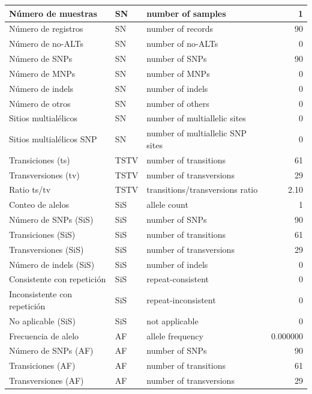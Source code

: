 \documentclass[12pt]{article}
\begin{document}
\begin{longtable}{|l|l|p{8cm}|r|}
    Número de muestras & SN & number of samples & 1 \\
    \hline
    Número de registros & SN & number of records & 90 \\
    \hline
    Número de no-ALTs & SN & number of no-ALTs & 0 \\
    \hline
    Número de SNPs & SN & number of SNPs & 90 \\
    \hline
    Número de MNPs & SN & number of MNPs & 0 \\
    \hline
    Número de indels & SN & number of indels & 0 \\
    \hline
    Número de otros & SN & number of others & 0 \\
    \hline
    Sitios multialélicos & SN & number of multiallelic sites & 0 \\
    \hline
    Sitios multialélicos SNP & SN & number of multiallelic SNP sites & 0 \\
    \hline
    Transiciones (ts) & TSTV & number of transitions & 61 \\
    \hline
    Transversiones (tv) & TSTV & number of transversions & 29 \\
    \hline
    Ratio ts/tv & TSTV & transitions/transversions ratio & 2.10 \\
    \hline
    Conteo de alelos & SiS & allele count & 1 \\
    \hline
    Número de SNPs (SiS) & SiS & number of SNPs & 90 \\
    \hline
    Transiciones (SiS) & SiS & number of transitions & 61 \\
    \hline
    Transversiones (SiS) & SiS & number of transversions & 29 \\
    \hline
    Número de indels (SiS) & SiS & number of indels & 0 \\
    \hline
    Consistente con repetición & SiS & repeat-consistent & 0 \\
    \hline
    Inconsistente con repetición & SiS & repeat-inconsistent & 0 \\
    \hline
    No aplicable (SiS) & SiS & not applicable & 0 \\
    \hline
    Frecuencia de alelo & AF & allele frequency & 0.000000 \\
    \hline
    Número de SNPs (AF) & AF & number of SNPs & 90 \\
    \hline
    Transiciones (AF) & AF & number of transitions & 61 \\
    \hline
    Transversiones (AF) & AF & number of transversions & 29 \\

\end{longtable}
\end{document}
